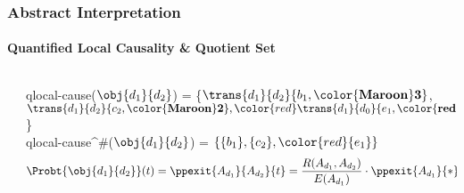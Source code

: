 \begin{frame}
\frametitle{Abstract Interpretation}
\framesubtitle{Quantified Local Causality \& Quotient Set}
\begin{columns}
\begin{column}{0.3\textwidth}
\begin{left}\scalebox{\scaleex}{
\begin{tikzpicture}
\exsanaidef
\end{tikzpicture}
}\end{left}
\end{column}
\begin{column}[c]{0.7\textwidth}

qlocal-cause($\obj{d_1}{d_2}$) = \{$\trans{d_1}{d_2}{b_1,\mathbf{\color{Maroon} 3}}$, $\trans{d_1}{d_2}{c_2,\mathbf{\color{Maroon} 2}},
{\color{red} \trans{d_1}{d_0}{e_1,\mathbf{\color{red} 2}}}$\}\\
\medskip
qlocal-cause^\#($\obj{d_1}{d_2}$) = $\{\{b_1\},\{c_2\},{\color{red}\{e_1\}}\}$ \\

$$\Probt{\obj{d_1}{d_2}}(t) =\ppexit{A_{d_1}}{A_{d_2}}{t}= \frac{R (A_{d_1},A_{d_2})}{E (A_{d_1})} \cdot \ppexit{A_{d_1}}{*}{t} $$ \\


\hspace*{1em}
\begin{center}\scalebox{\scaleex}{
\exqlcgaidef
}\end{center}

\end{column}
\end{columns}


\end{frame}

